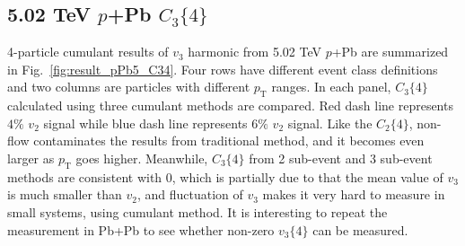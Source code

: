 \subsection{5.02 TeV $p$+Pb $C_{3}\{4\}$}
4-particle cumulant results of $v_{3}$ harmonic from 5.02 TeV $p$+Pb are summarized in Fig.~\ref{fig:result_pPb5_C34}. Four rows have different event class definitions and two columns are particles with different $p_{\text{T}}$ ranges. In each panel, $C_{3}\{4\}$ calculated using three cumulant methods are compared. Red dash line represents $4\%$ $v_{2}$ signal while blue dash line represents $6\%$ $v_{2}$ signal. Like the $C_{2}\{4\}$, non-flow contaminates the results from traditional method, and it becomes even larger as $p_{\text{T}}$ goes higher. Meanwhile, $C_{3}\{4\}$ from 2 sub-event and 3 sub-event methods are consistent with 0, which is partially due to that the mean value of $v_{3}$ is much smaller than $v_{2}$, and fluctuation of $v_{3}$ makes it very hard to measure in small systems, using cumulant method. It is interesting to repeat the measurement in Pb+Pb to see whether non-zero $v_{3}\{4\}$ can be measured.
